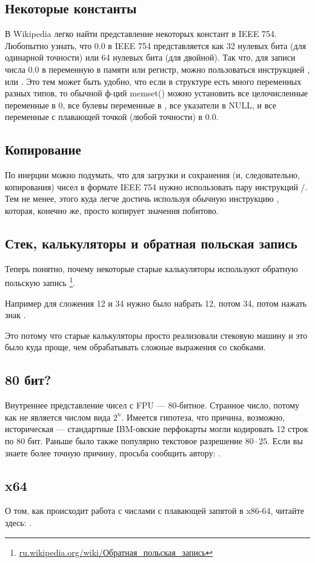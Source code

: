 \subsection{Некоторые константы}

В Wikipedia легко найти представление некоторых констант в IEEE 754.
Любопытно узнать, что 0.0 в IEEE 754 представляется как 32 нулевых бита (для одинарной точности) или 64 нулевых бита
(для двойной).
Так что, для записи числа 0.0 в переменную в памяти или регистр, можно пользоваться инструкцией \MOV, или .
Это тем может быть удобно, что если в структуре есть много переменных разных типов, то обычной ф-ций memset()
можно установить все целочисленные переменные в 0, все булевы переменные в , все указатели в NULL,
и все переменные с плавающей точкой (любой точности) в 0.0.

\subsection{Копирование}

По инерции можно подумать, что для загрузки и сохранения (и, следовательно, копирования) чисел в формате
IEEE 754 нужно использовать пару инструкций /.
Тем не менее, этого куда легче достичь используя обычную инструкцию ,
которая, конечно же, просто копирует значения побитово.

\subsection{Стек, калькуляторы и обратная польская запись}

Теперь понятно, почему некоторые старые калькуляторы используют обратную польскую запись
\footnote{\href{http://go.yurichev.com/17355}{ru.wikipedia.org/wiki/Обратная\_польская\_запись}}.

Например для сложения 12 и 34 нужно было набрать 12, потом 34, потом нажать знак .

Это потому что старые калькуляторы просто реализовали стековую машину и это было куда проще, чем обрабатывать сложные выражения со скобками.

\subsection{80 бит?}

Внутреннее представление чисел с FPU --- 80-битное.
Странное число, потому как не является числом вида $2^n$.
Имеется гипотеза, что причина, возможно, историческая --- стандартные IBM-овские перфокарты могли кодировать 12 строк по 80 бит.
Раньше было также популярно текстовое разрешение $80 \cdot 25$.
Если вы знаете более точную причину, просьба сообщить автору: \EMAIL{}.

\subsection{x64}

О том, как происходит работа с числами с плавающей запятой в x86-64, читайте здесь: .



